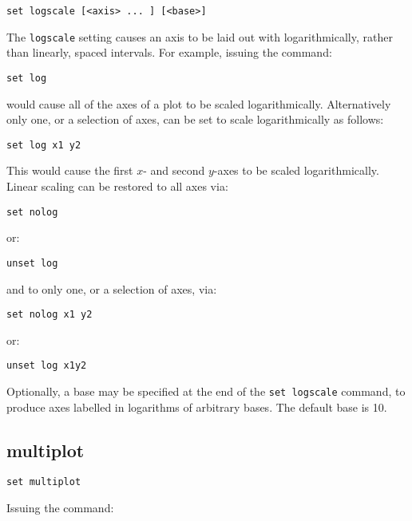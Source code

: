 \begin{verbatim}
set logscale [<axis> ... ] [<base>]
\end{verbatim}

The {\tt logscale} setting causes an axis to be laid out with logarithmically,
rather than linearly, spaced intervals.  For example, issuing the command:

\begin{verbatim}
set log
\end{verbatim}

\noindent would cause all of the axes of a plot to be scaled logarithmically. Alternatively
only one, or a selection of axes, can be set to scale logarithmically as
follows:

\begin{verbatim}
set log x1 y2
\end{verbatim}

This would cause the first $x$- and second $y$-axes to be scaled logarithmically.
Linear scaling can be restored to all axes via:

\begin{verbatim}
set nolog
\end{verbatim}

\noindent or:

\begin{verbatim}
unset log
\end{verbatim}

\noindent and to only one, or a selection of axes, via:

\begin{verbatim}
set nolog x1 y2
\end{verbatim}

\noindent or:

\begin{verbatim}
unset log x1y2
\end{verbatim}

Optionally, a base may be specified at the end of the {\tt set logscale}
command, to produce axes labelled in logarithms of arbitrary bases.  The default
base is 10.

\subsection{multiplot}

\begin{verbatim}
set multiplot
\end{verbatim}

Issuing the command:

